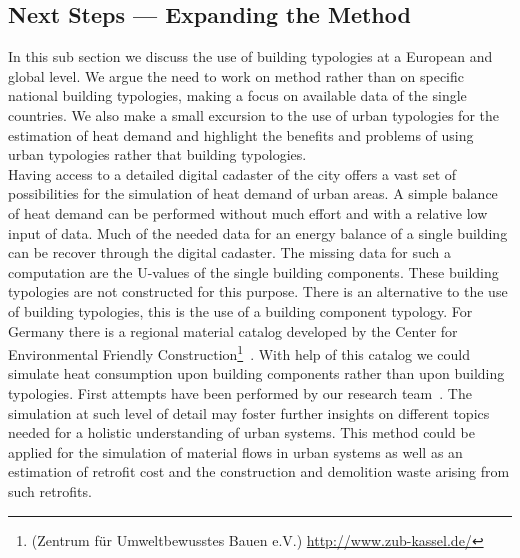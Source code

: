 \documentclass[authoryear,preprint,review,12pt]{elsarticle}
\begin{document}
\begin{linenumbers}
\subsection{Next Steps --- Expanding the Method}\label{sub-section:next}

In this sub section we discuss the use of building typologies at a European
and global level. We argue the need to work on method rather than on specific
national building typologies, making a focus on available data of the single
countries.  We also make a small excursion to the use of urban typologies for
the estimation of heat demand and highlight the benefits and problems of using
urban typologies rather that building typologies.\\

Having access to a detailed digital cadaster of the city offers a vast set of
possibilities for the simulation of heat demand of urban areas.  A simple
balance of heat demand can be performed without much effort and with a relative
low input of data.  Much of the needed data for an energy balance of a single
building can be recover through the digital cadaster.  The missing data for
such a computation are the U-values of the single building components.  These
building typologies are not constructed for this purpose.  There is an
alternative to the use of building typologies, this is the use of a building
component typology.  For Germany there is a regional material catalog developed
by the Center for Environmental Friendly Construction\footnote{(Zentrum für
    Umweltbewusstes Bauen e.V.)
    \url{http://www.zub-kassel.de/}}~\cite{Klauss.2009}.
With help of this catalog we could simulate heat consumption upon building
components rather than upon building typologies.  First attempts have been
performed by our research team~\cite{Munoz.2014c}. The simulation at such level of
detail may foster further insights on different topics needed for a holistic
understanding of urban systems.  This method could be applied for the
simulation of material flows in urban systems as well as an estimation of
retrofit cost and the construction and demolition waste arising from such
retrofits.\\


% 
%

%

\end{linenumbers}
\end{document}
